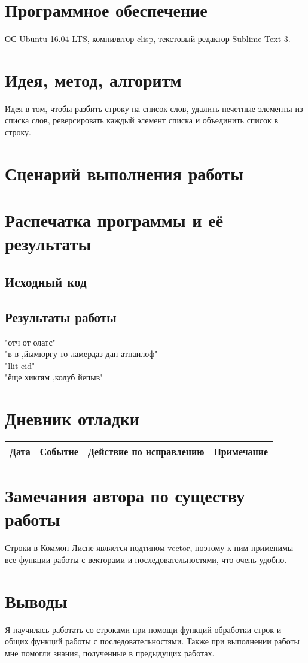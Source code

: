 \documentclass[12pt]{article}
\begin{document}
\section{Программное обеспечение}
ОС Ubuntu 16.04 LTS, компилятор clisp, текстовый редактор Sublime Text 3.

\section{Идея, метод, алгоритм}
Идея в том, чтобы разбить строку на список слов, удалить нечетные элементы из списка слов, реверсировать каждый элемент списка и объединить список в строку.

\section{Сценарий выполнения работы}

\section{Распечатка программы и её результаты}

\subsection{Исходный код}


\subsection{Результаты работы}
"отч от олатс"\ \\
"в в ,йымюргу то ламердаз дан атнаилоф"\ \\ 
"llit eid"\ \\
"ёще хикгям ,колуб йепыв"\

\section{Дневник отладки}
\begin{tabular}{|p{50pt}|p{130pt}|p{130pt}|p{70pt}|}
\hline
Дата & Событие & Действие по исправлению & Примечание\\
\hline
\end{tabular}

\section{Замечания автора по существу работы}
Строки в Коммон Лиспе является подтипом vector, поэтому к ним применимы все функции работы с векторами и последовательностями, что очень удобно.

\section{Выводы}
Я научилась работать со строками при помощи функций обработки строк и общих функций работы с последовательностями. Также при выполнении работы мне помогли знания, полученные в предыдущих работах.
\end{document}

